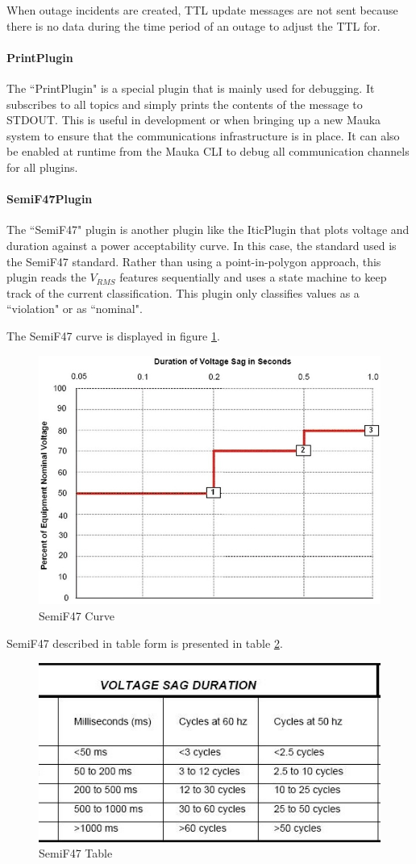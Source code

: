 When outage incidents are created, TTL update messages are not sent because there is no data during the time period of an outage to adjust the TTL for.

\paragraph{PrintPlugin}
The ``PrintPlugin" is a special plugin that is mainly used for debugging. It subscribes to all topics and simply prints the contents of the message to STDOUT. This is useful in development or when bringing up a new Mauka system to ensure that the communications infrastructure is in place. It can also be enabled at runtime from the Mauka CLI to debug all communication channels for all plugins.

\paragraph{SemiF47Plugin}
The ``SemiF47" plugin is another plugin like the IticPlugin that plots voltage and duration against a power acceptability curve. In this case, the standard used is the SemiF47 standard\cite{semif47}. Rather than using a point-in-polygon approach, this plugin reads the $V_{RMS}$ features sequentially and uses a state machine to keep track of the current classification. This plugin only classifies values as a ``violation" or as ``nominal".

The SemiF47 curve is displayed in figure \ref{fig:SemiF47Curve}.

\begin{figure}
	\centering
	\includegraphics[width=0.6\linewidth]{figures/semif47.jpg}
	\caption{SemiF47 Curve}
	\label{fig:SemiF47Curve}
\end{figure}

SemiF47 described in table form is presented in table \ref{fig:SemiF47Table}.

\begin{figure}
	\centering
	\includegraphics[width=0.6\linewidth]{figures/semif47_table.jpg}
	\caption{SemiF47 Table}
	\label{fig:SemiF47Table}
\end{figure}


